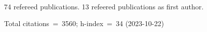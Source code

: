 74 refereed publications. 13 refeered publications as first author.

Total citations~=~3560; h-index~=~34 (2023-10-22)
